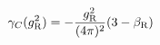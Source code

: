 \begin{equation}
\gamma_C(g_{\rm R}^2)
 =-\frac{g_{\rm R}^2}{(4\pi)^2}
  (3-\beta_{\rm R}) 
\end{equation}

